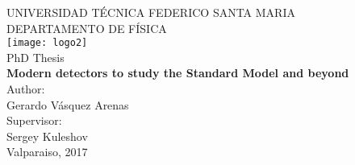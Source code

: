 \begin{titlepage}
	\begin{center}
		\vspace*{1cm}
		\Large
		UNIVERSIDAD T\'ECNICA FEDERICO SANTA MARIA\\
		DEPARTAMENTO DE F\'ISICA\\
		\vspace*{1cm}
		\texttt{[image: logo2]}\\
		\vspace{1.5cm}
		\Large PhD Thesis\\
		\vspace{1cm}
		{\Huge
		{\bf Modern detectors to study the Standard Model and beyond}
		}\\
		\vspace{2.5cm}
		Author:\\
		Gerardo V\'asquez Arenas\\
		\vspace*{0.5cm}
		Supervisor:\\
		Sergey Kuleshov\\
		\vfill
		Valparaiso, 2017



		\end{center}
\end{titlepage}

